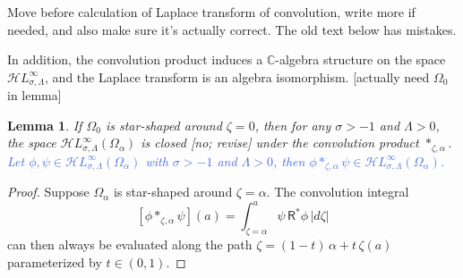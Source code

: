 \documentclass{article}
\newcommand{\singexp}[2]{\mathcal{H}L^\infty_{#1, #2}}
\newcommand{\C}{\mathbb{C}}
\theoremstyle{definition}
\theoremstyle{plain}
\newtheorem{lemma}[definition]{Lemma}
\newenvironment{todo}{\color{Coral}}{\color{black}}
\newenvironment{old}{\color{RoyalBlue}}{\color{black}}
\begin{document}
\begin{todo}Move before calculation of Laplace transform of convolution, write more if needed, and also make sure it's actually correct. The old text below has mistakes.\end{todo}
\begin{old}\par In addition, the convolution product induces a $\C$-algebra structure on the space $\singexp{\sigma}{\Lambda}$, and the Laplace transform is an algebra isomorphism.
\begin{todo}[actually need $\Omega_0$ in lemma]\end{todo}
\begin{lemma}
If $\Omega_0$ is star-shaped around $\zeta = 0$, then for any $\sigma > -1$ and $\Lambda > 0$, the space $\singexp{\sigma}{\Lambda}(\Omega_\alpha)$ is closed \begin{todo}[no; revise]\end{todo} under the convolution product $\ast_{\zeta, \alpha}$.
\textcolor{RoyalBlue}{Let $\phi,\psi\in\singexp{\sigma}{\Lambda}(\Omega_\alpha)$ with $\sigma>-1$ and $\Lambda>0$, then $\phi\ast_{\zeta,\alpha}\psi\in\singexp{\sigma}{\Lambda}(\Omega_\alpha)$.}
\end{lemma}
\begin{proof}
Suppose $\Omega_\alpha$ is star-shaped around $\zeta = \alpha$. The convolution integral
\[ [\phi \ast_{\zeta, \alpha} \psi](a) = \int_{\zeta = \alpha}^a \psi\,\mathsf{R}^*\phi\,|d\zeta| \]
can then always be evaluated along the path $\zeta = (1-t)\,\alpha + t\,\zeta(a)$ parameterized by $t \in (0, 1)$.


\end{proof}
\end{old}
\end{document}
